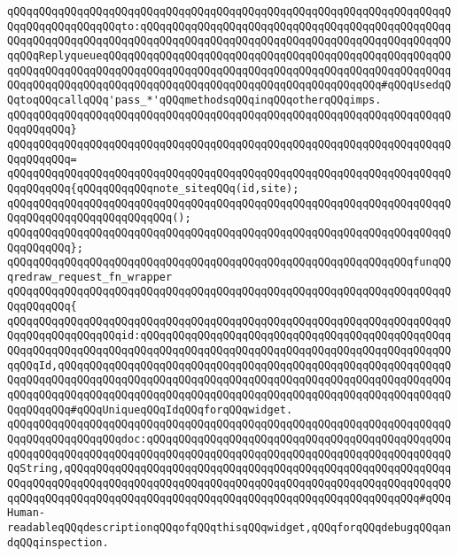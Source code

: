 \verb|qQQqqQQqqQQqqQQqqQQqqQQqqQQqqQQqqQQqqQQqqQQqqQQqqQQqqQQqqQQqqQQqqQQqqQQqqQQqqQQqqQQqqQQqto:qQQqqQQqqQQqqQQqqQQqqQQqqQQqqQQqqQQqqQQqqQQqqQQqqQQqqQQqqQQqqQQqqQQqqQQqqQQqqQQqqQQqqQQqqQQqqQQqqQQqqQQqqQQqqQQqqQQqqQQqqQQqReplyqueueqQQqqQQqqQQqqQQqqQQqqQQqqQQqqQQqqQQqqQQqqQQqqQQqqQQqqQQqqQQqqQQqqQQqqQQqqQQqqQQqqQQqqQQqqQQqqQQqqQQqqQQqqQQqqQQqqQQqqQQqqQQqqQQqqQQqqQQqqQQqqQQqqQQqqQQqqQQqqQQqqQQqqQQqqQQqqQQqqQQqqQQq#qQQqUsedqQQqtoqQQqcallqQQq'pass_*'qQQqmethodsqQQqinqQQqotherqQQqimps.|\newline
\verb|qQQqqQQqqQQqqQQqqQQqqQQqqQQqqQQqqQQqqQQqqQQqqQQqqQQqqQQqqQQqqQQqqQQqqQQqqQQqqQQq}|\newline
\verb|qQQqqQQqqQQqqQQqqQQqqQQqqQQqqQQqqQQqqQQqqQQqqQQqqQQqqQQqqQQqqQQqqQQqqQQqqQQqqQQq=|\newline
\verb|qQQqqQQqqQQqqQQqqQQqqQQqqQQqqQQqqQQqqQQqqQQqqQQqqQQqqQQqqQQqqQQqqQQqqQQqqQQqqQQq{qQQqqQQqqQQqnote_siteqQQq(id,site);|\newline
\verb|qQQqqQQqqQQqqQQqqQQqqQQqqQQqqQQqqQQqqQQqqQQqqQQqqQQqqQQqqQQqqQQqqQQqqQQqqQQqqQQqqQQqqQQqqQQqqQQq();|\newline
\verb|qQQqqQQqqQQqqQQqqQQqqQQqqQQqqQQqqQQqqQQqqQQqqQQqqQQqqQQqqQQqqQQqqQQqqQQqqQQqqQQq};|\newline
\newline
\verb|qQQqqQQqqQQqqQQqqQQqqQQqqQQqqQQqqQQqqQQqqQQqqQQqqQQqqQQqqQQqqQQqfunqQQqredraw_request_fn_wrapper|\newline
\verb|qQQqqQQqqQQqqQQqqQQqqQQqqQQqqQQqqQQqqQQqqQQqqQQqqQQqqQQqqQQqqQQqqQQqqQQqqQQqqQQq{|\newline
\verb|qQQqqQQqqQQqqQQqqQQqqQQqqQQqqQQqqQQqqQQqqQQqqQQqqQQqqQQqqQQqqQQqqQQqqQQqqQQqqQQqqQQqqQQqid:qQQqqQQqqQQqqQQqqQQqqQQqqQQqqQQqqQQqqQQqqQQqqQQqqQQqqQQqqQQqqQQqqQQqqQQqqQQqqQQqqQQqqQQqqQQqqQQqqQQqqQQqqQQqqQQqqQQqqQQqqQQqId,qQQqqQQqqQQqqQQqqQQqqQQqqQQqqQQqqQQqqQQqqQQqqQQqqQQqqQQqqQQqqQQqqQQqqQQqqQQqqQQqqQQqqQQqqQQqqQQqqQQqqQQqqQQqqQQqqQQqqQQqqQQqqQQqqQQqqQQqqQQqqQQqqQQqqQQqqQQqqQQqqQQqqQQqqQQqqQQqqQQqqQQqqQQqqQQqqQQqqQQqqQQqqQQqqQQq#qQQqUniqueqQQqIdqQQqforqQQqwidget.|\newline
\verb|qQQqqQQqqQQqqQQqqQQqqQQqqQQqqQQqqQQqqQQqqQQqqQQqqQQqqQQqqQQqqQQqqQQqqQQqqQQqqQQqqQQqqQQqdoc:qQQqqQQqqQQqqQQqqQQqqQQqqQQqqQQqqQQqqQQqqQQqqQQqqQQqqQQqqQQqqQQqqQQqqQQqqQQqqQQqqQQqqQQqqQQqqQQqqQQqqQQqqQQqqQQqqQQqqQQqString,qQQqqQQqqQQqqQQqqQQqqQQqqQQqqQQqqQQqqQQqqQQqqQQqqQQqqQQqqQQqqQQqqQQqqQQqqQQqqQQqqQQqqQQqqQQqqQQqqQQqqQQqqQQqqQQqqQQqqQQqqQQqqQQqqQQqqQQqqQQqqQQqqQQqqQQqqQQqqQQqqQQqqQQqqQQqqQQqqQQqqQQqqQQqqQQqqQQq#qQQqHuman-readableqQQqdescriptionqQQqofqQQqthisqQQqwidget,qQQqforqQQqdebugqQQqandqQQqinspection.|\newline
